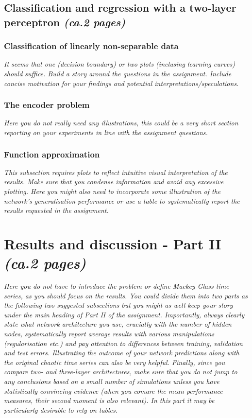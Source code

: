\documentclass[a4paper]{article}
\begin{document}
\subsection{Classification and regression with a two-layer perceptron \textit{(ca.2 pages)}}

\subsubsection{Classification of linearly non-separable data}
\textit{It seems that one (decision boundary) or two plots (inclusing learning curves) should suffice. Build a story around the questions in the assignment. Include concise motivation for your findings and potential interpretations/speculations.}

\subsubsection{The encoder problem}
\textit{Here you do not really need any illustrations, this could be a very short section reporting on your experiments in line with the assignment questions.}

\subsubsection{Function approximation}
\textit{This subsection requires plots to reflect intuitive visual interpretation of the results. Make sure that you condense information and avoid any excessive plotting. Here you might also need to incorporate some illustration of the network's generalisation performance or use a table to systematically report the results requested in the assignment.}

\section{Results and discussion - Part II \textit{(ca.2 pages)}}

\textit{Here you do not have to introduce the problem or define Mackey-Glass time series, as you should focus on the results. You could divide them into two parts as the following two suggested subsections but you might as well keep your story under the main heading of Part II of the assignment. Importantly, always clearly state what network architecture you use, crucially with the number of hidden nodes, systematically report average results with various manipulations (regularisation etc.) and pay attention to differences between training, validation and test errors. Illustrating the outcome of your network predictions along with the original chaotic time series can also be very helpful. Finally, since you compare two- and three-layer architectures, make sure that you do not jump to any conclusions based on a small number of simulations unless you have statistically convincing evidence (when you comare the mean performance measures, their second moment is also relevant). In this part it may be particularly desirable to rely on tables.}
\end{document}
